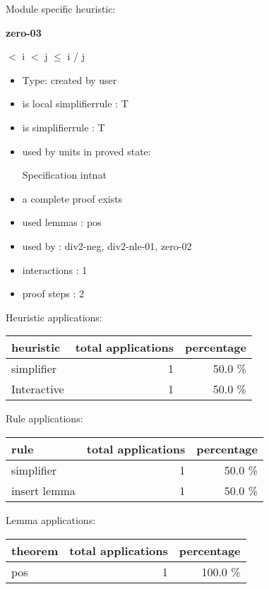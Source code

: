 \documentclass[a4paper]{article}
\begin{document}
Module specific heuristic:

\pagebreak

{\LARGE\bf zero-03}\label{lemma-zero-03}

\medskip

  $<$ i  $<$ j  $\le$ i / j

\begin{itemize}

\item Type: created by user

\item is local simplifierrule : T
\item is simplifierrule : T
\item used by units in proved state:

Specification intnat
\item       a complete proof exists
\item       used lemmas  : pos
\item       used by      : div2-neg, div2-nle-01, zero-02
\item       interactions : 1
\item       proof steps  : 2
\end{itemize}

\medskip


Heuristic applications:

\begin{supertabular}{l|r|r}
heuristic	& total applications & percentage \\ \hline
simplifier & 1 & 50.0 \% \\
Interactive & 1 & 50.0 \% \\

\end{supertabular}

Rule applications:

\begin{supertabular}{l|r|r}
rule	        & total applications & percentage \\ \hline
simplifier & 1 & 50.0 \% \\
insert lemma & 1 & 50.0 \% \\

\end{supertabular}

Lemma applications:

\begin{supertabular}{l|r|r}
theorem	        & total applications & percentage \\ \hline
pos & 1 & 100.0 \% \\

\end{supertabular}
\end{document}
